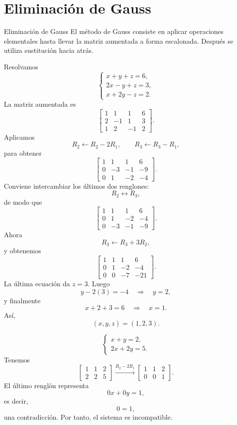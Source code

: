 \documentclass[aspectratio=169,9pt]{beamer}
\theoremstyle{remark}
\begin{document}
\section{Eliminación de Gauss}
\begin{frame}[allowframebreaks,t]{Eliminación de Gauss}
El método de Gauss consiste en aplicar operaciones elementales hasta llevar la matriz aumentada a forma
escalonada. Después se utiliza sustitución hacia atrás.

\par{}\par\smallskip

Resolvamos
\[
\begin{cases}
x+y+z=6,\\
2x-y+z=3,\\
x+2y-z=2.
\end{cases}
\]
La matriz aumentada es
\[
\left[
\begin{array}{ccc|c}
1&1&1&6\\
2&-1&1&3\\
1&2&-1&2
\end{array}
\right].
\]
Aplicamos
\[
R_2\leftarrow R_2-2R_1,\qquad
R_3\leftarrow R_3-R_1,
\]
para obtener
\[
\left[
\begin{array}{ccc|c}
1&1&1&6\\
0&-3&-1&-9\\
0&1&-2&-4
\end{array}
\right].
\]
Conviene intercambiar los últimos dos renglones:
\[
R_2\leftrightarrow R_3,
\]
de modo que
\[
\left[
\begin{array}{ccc|c}
1&1&1&6\\
0&1&-2&-4\\
0&-3&-1&-9
\end{array}
\right].
\]
Ahora
\[
R_3\leftarrow R_3+3R_2,
\]
y obtenemos
\[
\left[
\begin{array}{ccc|c}
1&1&1&6\\
0&1&-2&-4\\
0&0&-7&-21
\end{array}
\right].
\]
La última ecuación da $z=3$. Luego
\[
y-2(3)=-4\quad\Longrightarrow\quad y=2,
\]
y finalmente
\[
x+2+3=6\quad\Longrightarrow\quad x=1.
\]
Así,
\[
\boxed{(x,y,z)=(1,2,3)}.
\]

\par{}\par\smallskip

\[
\begin{cases}
x+y=2,\\
2x+2y=5.
\end{cases}
\]
Tenemos
\[
\left[
\begin{array}{cc|c}
1&1&2\\
2&2&5
\end{array}
\right]
\xrightarrow{R_2-2R_1}
\left[
\begin{array}{cc|c}
1&1&2\\
0&0&1
\end{array}
\right].
\]
El último renglón representa
\[
0x+0y=1,
\]
es decir,
\[
0=1,
\]
una contradicción. Por tanto, el sistema es incompatible.


\end{frame}
\end{document}

